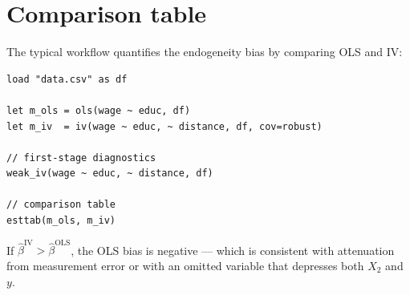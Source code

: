 \section{Comparison table}

The typical workflow quantifies the endogeneity bias by comparing OLS and IV:

\begin{lstlisting}[caption={Complete IV analysis workflow}]
load "data.csv" as df

let m_ols = ols(wage ~ educ, df)
let m_iv  = iv(wage ~ educ, ~ distance, df, cov=robust)

// first-stage diagnostics
weak_iv(wage ~ educ, ~ distance, df)

// comparison table
esttab(m_ols, m_iv)
\end{lstlisting}

If $\hat{\beta}^{\mathrm{IV}} > \hat{\beta}^{\mathrm{OLS}}$, the OLS bias
is negative --- which is consistent with attenuation from measurement error or with
an omitted variable that depresses both $X_2$ and $y$.
